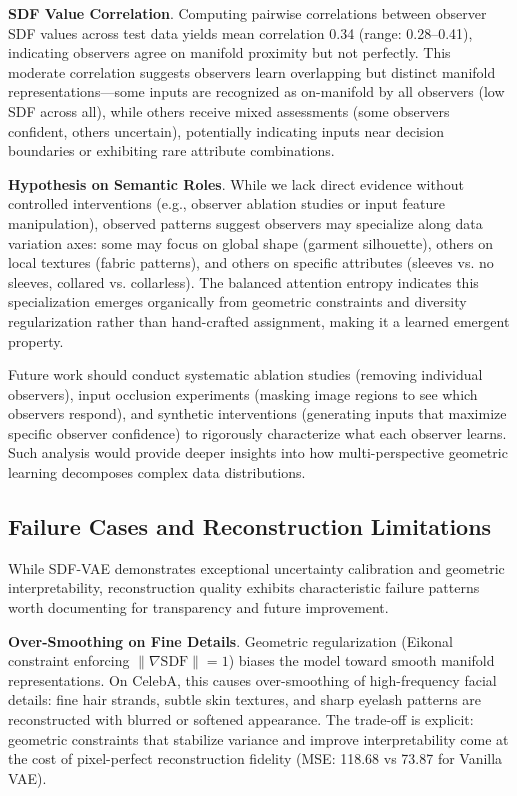 \documentclass[10pt,twocolumn,letterpaper]{article}
\begin{document}
\textbf{SDF Value Correlation}. Computing pairwise correlations between observer SDF values across test data yields mean correlation 0.34 (range: 0.28--0.41), indicating observers agree on manifold proximity but not perfectly. This moderate correlation suggests observers learn overlapping but distinct manifold representations—some inputs are recognized as on-manifold by all observers (low SDF across all), while others receive mixed assessments (some observers confident, others uncertain), potentially indicating inputs near decision boundaries or exhibiting rare attribute combinations.

\textbf{Hypothesis on Semantic Roles}. While we lack direct evidence without controlled interventions (e.g., observer ablation studies or input feature manipulation), observed patterns suggest observers may specialize along data variation axes: some may focus on global shape (garment silhouette), others on local textures (fabric patterns), and others on specific attributes (sleeves vs. no sleeves, collared vs. collarless). The balanced attention entropy indicates this specialization emerges organically from geometric constraints and diversity regularization rather than hand-crafted assignment, making it a learned emergent property.

Future work should conduct systematic ablation studies (removing individual observers), input occlusion experiments (masking image regions to see which observers respond), and synthetic interventions (generating inputs that maximize specific observer confidence) to rigorously characterize what each observer learns. Such analysis would provide deeper insights into how multi-perspective geometric learning decomposes complex data distributions.

\subsection{Failure Cases and Reconstruction Limitations}

While SDF-VAE demonstrates exceptional uncertainty calibration and geometric interpretability, reconstruction quality exhibits characteristic failure patterns worth documenting for transparency and future improvement.

\textbf{Over-Smoothing on Fine Details}. Geometric regularization (Eikonal constraint enforcing $\|\nabla \text{SDF}\| = 1$) biases the model toward smooth manifold representations. On CelebA, this causes over-smoothing of high-frequency facial details: fine hair strands, subtle skin textures, and sharp eyelash patterns are reconstructed with blurred or softened appearance. The trade-off is explicit: geometric constraints that stabilize variance and improve interpretability come at the cost of pixel-perfect reconstruction fidelity (MSE: 118.68 vs 73.87 for Vanilla VAE).
\end{document}
